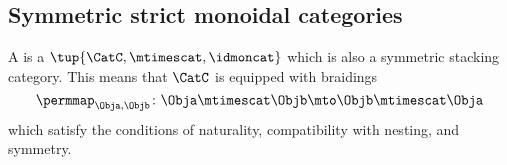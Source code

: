 {    

    \subsection{Symmetric strict monoidal categories}
    
    

    
    \begin{ctdefinition}
        \label{def:symmetric-strict-monoidal-cat}
        A  is a  $\tup{\CatC, \mtimescat, \idmoncat}$ which is also a symmetric stacking category. This means that $\CatC$ is equipped with braidings 
        \begin{equation}
                      \permmap_{\Obja, \Objb} \colon \Obja \mtimescat \Objb \mto \Objb \mtimescat \Obja                  \end{equation}
                  which satisfy the conditions of naturality, compatibility with nesting, and symmetry. 
    \end{ctdefinition}


}
